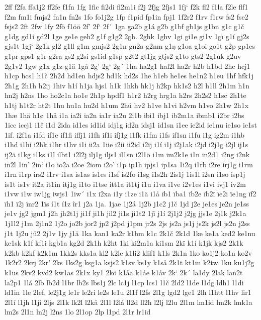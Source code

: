 2ff
f2fa
ffa1j2
ff2fe
f1fn
1fg
1fic
fi2di
fi2m1i
f2j
2fjg
2fjs1
1fj`
f2k
fl2
f1la
f2le
flf1
f2m
fm1i
fmjs2
fn1n
fn2s
1fo
fo1j2g
1fp
f1pid
fp1in
fpj1
1f2r2
f1rv
f1rw
fs2
fse2
fsjs2
2ft
2fw
1fy
2fö
f1öö
2f'
2f`
2f´
1ga
ga2b
g1á
g2b
g1bf
gb1js
g1bn
g1c
g1č
g1dg
gd1i
gd2l
1ge
ge1e
geh2
g1f
g1g2
2gh.
2ghk
1ghv
1gi
gi1e
gi1v
1gï
g1í
gj2s
gjs1t
1gj`
2g1k
gl2
g1ll
g1m
gmjs2
2g1n
gn2a
g2nm
g1ŋ
g1oa
g1oi
go1t
g2p
gp1es
g1pr
gps1
g1r
g2ra
gs2
g2si
gs1id
g1sp
g2t2
gt1jg
gtjs2
g1to
gts2
2g1uk
g2uv
2g1v2
1gw
g1x
g1z
g1ä
1gå
2g'
2g`
2g´
1ha
ha2g1
hal2l
ha2r
h2b
h1bd
2hc
hcj1
h1cp
hcs1
h1č
2h2d
hd1en
hdjs2
hd1k
hd2s
1he
h1eb
he1es
he1n2
h1eu
1hf
hfk1j
2h1g
2h1h
h2ij
1hiv
h1í
h1ja
hjs1
h1k
1hkh
hk1j
h2kp
hk1s2
h2l
h1ll
2h1m
h1n
hn2j
h2ns
1ho
ho2c1a
ho1e
2h1p
hpdf1
h1r2
h2rg
hrg1a
h2rs
2h2s2
h1sc
2h1te
h1tj
h1t2r
ht2t
1hu
hu1a
hu2d
h1um
2hü
hv2
h1ve
h1vi
h2vm
h1vo
2h1w
2h1x
1hæ
1hä
h1ø
1hå
i1a
ia2i
ia2n
ia1r
ia2u
2i1b
ibi1
ibj1
ib2m1a
ibmb1
i2br
i2bs
1icc
iccj1
i1č
i1d
2ida
id1es
id1id
idj1g
id2n
idsj1
id1sn
i1ee
ie2id
ie1nu
ie1so
ie1st
1if.
i2f1a
i1fd
if1e
if1fi
iffj1
i1fh
if1i
ifj1g
i1fk
i1fm
i1fs
if1sn
i1fu
i1g
ig2m
i1hb
i1hd
i1hi
i2hk
i1hr
i1hv
i1i
ii2a
1iie
i2ii
ii2id
i2ij
i1í
i1j
i2j1ak
i2jd
i2j1g
i2jl
ij1s
ij2ä
i1kg
i1ks
i1l
ilbt1
i2l2j
ilj1g
iljs1
il1sn
i2l1ö
i1m
im2k1e
i1n
in2d1
i2ng
i2nk
in2l
1in'
2in`
i1o
io2a
i2oe
2iom
i2o'
i1p
ip1h
ipjs1
ip1sa
1i2q
i1rb
i2re
irj1g
i1rm
i1rn
i1rp
irs2
i1rv
i1sa
is1as
is1es
i1sf
is2fo
i1sg
i1s2h
2is1j
1is1l
i2sn
i1so
isp1j
is1t
is1v
it2a
it1in
itj1g
i1to
i1tse
itt1a
it1tj
i1u
i1va
i1ve
i2v1es
i1vi
ivj1
iv2m
i1vw
i1w
iw1jg
iwjs1
1iw´
i1x
i2xa
i1y
i1ze
i1ä
i1å
ïb1
ïba1
ïb2e
ïb2ï
ïe2i
ïe1ng
ïf2
ïh1
ï2j
ïnr2
1ïs
í1t
í1z
îr1
j2a
1ja.
1jae
1j2á
1j2b
j1c2
j1č
1jd
j2e
je1es
je2n
je1ss
je1v
jg2
jgm1
j2h
jh2t1j
ji1f
ji1h
jil2
ji1s
ji1t2
1jï
j1í
2j1j2
j2jg
jjs1e
2j1k
j2k1a
1j1l2
j1m
2j1n2
1j2o
jo2b
jor2
jp2
j2pd
j1pm
jr2s
2js
js2a
js1j
js2k
js2l
js2n
j2ss
j1t
1j2u
jü2
2j1v
1jy
j1ä
1ka
kan1
ka2r
k1bm
k1c
2k1č
2k1d
1ke
ke1a
ked2
ke1nu
ke1sk
k1f
kf1i
kgb1a
kg2d
2k1h
k2ht
1ki
ki2m1a
ki1sm
2kï
k1í
k1jk
kjs2
2k1k
k2kb
k2kf
k2k1m
1kk2s
kks1a
kl2
k2le
k1li2
klif1
k1ls
2k1n
1ko
ko1j2
ko1n
ko2v
1k2r2
2krj
2kr'
2ks
1ks2g
ksg1a
ksjs2
k1sv
ks1y
k1så
2k1t
kt1m
k2tw
1ku
ku1j2g
k1us
2kv2
kvd2
kw1as
2k1x
ky1
2kö
k1åa
k1åe
k1åv
2k`
2k´
la1dy
2lak
lan2t
la2p1
1lá
2lb
lb2d
l1br
lb2s
lbs1j
2lc
lc1j
l1cp
lcs1
l1č
2ld2
l1de
l1dg
ldh1
l1di
ld1in
1le
2lef.
le2j1g
le1r
le2ri
le2s
le1u
2l1f
l2fs
2l1g
lgd2
lge1
2lh
l1htt
l1hv
lir1
2l1í
l1jh
l1ji
2ljs
2l1k
lk2l
l2kå
2l1l
l2lá
ll2d
ll2h
l2lj
l2lu
2l1m
lm1id
lm2k
lmk1a
lm2s
2l1n
ln2j
l2ns
1lo
2l1op
2lp
l1pd
2l1r
lr1id
